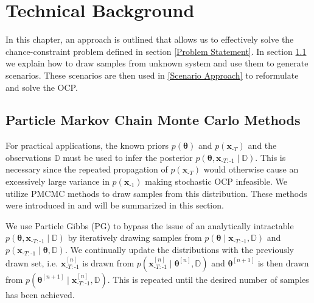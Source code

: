 \chapter{Technical Background} \label{Technical Background}

In this chapter, an approach is outlined that allows us to effectively solve the chance-constraint problem defined in section \ref{Problem Statement}. In section \ref{PGibbs sampling} we explain how to draw samples from unknown system and use them to generate scenarios. These scenarios are then used in \ref{Scenario Approach} to reformulate and solve the OCP.

\section{Particle Markov Chain Monte Carlo Methods} \label{PGibbs sampling}

For practical applications, the known priors $p(\boldsymbol{\theta})$ and $p(\boldsymbol{x}_{\text{-}T})$ and the observations $\mathbb{D}$ must be used to infer the posterior $p(\boldsymbol{\theta}, \boldsymbol{x}_{\text{-}T:\text{-}1}\mid \mathbb{D})$. This is necessary since the repeated propagation of $p(\boldsymbol{x}_{\text{-}T})$ would otherwise cause an excessively large variance in $p(\boldsymbol{x}_{\text{-}1})$ making stochastic OCP infeasible. We utilize PMCMC methods to draw samples from this distribution. These methods were introduced in \cite{Andrieu_10} and will be summarized in this section.

We use Particle Gibbs (PG) to bypass the issue of an analytically intractable $p(\boldsymbol{\theta}, \boldsymbol{x}_{\text{-}T:\text{-}1}\mid \mathbb{D})$ by iteratively drawing samples from $p(\boldsymbol{\theta} \mid \boldsymbol{x}_{\text{-}T:\text{-}1}, \mathbb{D})$ and $p(\boldsymbol{x}_{\text{-}T:\text{-}1}\mid \boldsymbol{\theta}, \mathbb{D})$. We continually update the distributions with the previously drawn set, i.e. $\boldsymbol{x}_{\text{-}T:\text{-}1}^{[n]}$ is drawn from $p(\boldsymbol{x}_{\text{-}T:\text{-}1}^{[n]}\mid \boldsymbol{\theta}^{[n]}, \mathbb{D})$ and $\boldsymbol{\theta}^{[n+1]}$ is then drawn from $p(\boldsymbol{\theta}^{[n+1]}\mid \boldsymbol{x}_{\text{-}T:\text{-}1}^{[n]}, \mathbb{D})$. This is repeated until the desired number of samples has been achieved.

